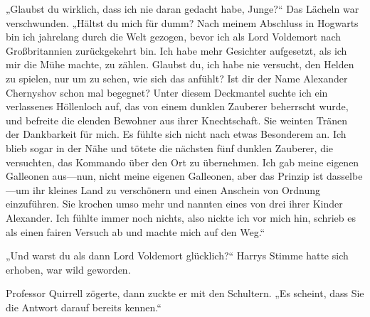 „Glaubst du wirklich, dass ich nie daran gedacht habe, Junge?“
Das Lächeln war verschwunden.
„Hältst du mich für dumm? Nach meinem Abschluss in Hogwarts bin ich jahrelang durch die Welt gezogen, bevor ich als Lord Voldemort nach Großbritannien zurückgekehrt bin. Ich habe mehr Gesichter aufgesetzt, als ich mir die Mühe machte, zu zählen. Glaubst du, ich habe nie versucht, den Helden zu spielen, nur um zu sehen, wie sich das anfühlt? Ist dir der Name Alexander Chernyshov schon mal begegnet? Unter diesem Deckmantel suchte ich ein verlassenes Höllenloch auf, das von einem dunklen Zauberer beherrscht wurde, und befreite die elenden Bewohner aus ihrer Knechtschaft. Sie weinten Tränen der Dankbarkeit für mich. Es fühlte sich nicht nach etwas Besonderem an. Ich blieb sogar in der Nähe und tötete die nächsten fünf dunklen Zauberer, die versuchten, das Kommando über den Ort zu übernehmen. Ich gab meine eigenen Galleonen aus—nun, nicht meine eigenen Galleonen, aber das Prinzip ist dasselbe—um ihr kleines Land zu verschönern und einen Anschein von Ordnung einzuführen. Sie krochen umso mehr und nannten eines von drei ihrer Kinder Alexander. Ich fühlte immer noch nichts, also nickte ich vor mich hin, schrieb es als einen fairen Versuch ab und machte mich auf den Weg.“

„Und warst du als dann Lord Voldemort glücklich?“
Harrys Stimme hatte sich erhoben, war wild geworden.

Professor Quirrell zögerte, dann zuckte er mit den Schultern.
„Es scheint, dass Sie die Antwort darauf bereits kennen.“


